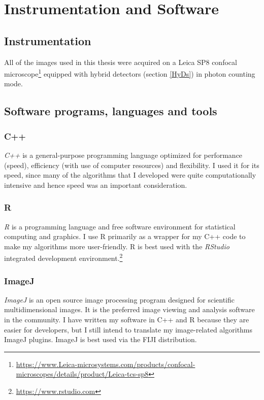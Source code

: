 \documentclass[12pt,]{book}
\let\rmarkdownfootnote\footnote%
\def\footnote{\protect\rmarkdownfootnote}
\theoremstyle{definition}
\theoremstyle{definition}
\theoremstyle{definition}
\theoremstyle{remark}
\begin{document}
\chapter{Instrumentation and
Software}\label{instrumentation-and-software}

\section{Instrumentation}\label{instrumentation}

All of the images used in this thesis were acquired on a Leica SP8
confocal microscope\footnote{\url{https://www.Leica-microsystems.com/products/confocal-microscopes/details/product/Leica-tcs-sp8}}
equipped with hybrid detectors (section \ref{HyDs}) in photon counting
mode.

\section{Software programs, languages and
tools}\label{software-programs-languages-and-tools}

\subsection{C++}\label{c}

\emph{C++} \citep{cpp} is a general-purpose programming language
optimized for performance (speed), efficiency (with use of computer
resources) and flexibility. I used it for its speed, since many of the
algorithms that I developed were quite computationally intensive and
hence speed was an important consideration.

\subsection{R}\label{r}

\emph{R} \citep{R} is a programming language and free software
environment for statistical computing and graphics. I use R primarily as
a wrapper for my C++ code to make my algorithms more user-friendly. R is
best used with the \emph{RStudio} integrated development
environment.\footnote{\url{https://www.rstudio.com}}

\subsection{ImageJ}\label{imagej}

\emph{ImageJ} \citep{ImageJ} is an open source image processing program
designed for scientific multidimensional images. It is the preferred
image viewing and analysis software in the community. I have written my
software in C++ and R because they are easier for developers, but I
still intend to translate my image-related algorithms ImageJ plugins.
ImageJ is best used via the FIJI \citep{FIJI} distribution.
\end{document}
